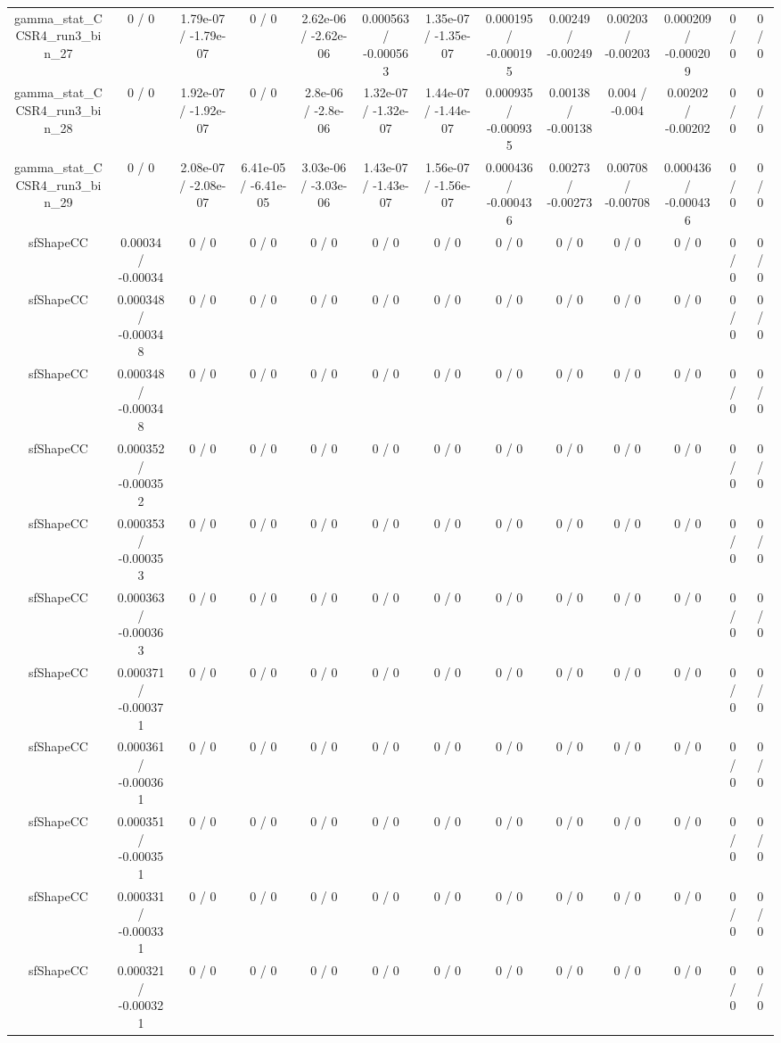 \documentclass[10pt]{article}
\begin{document}
\begin{table}[htbp]
\begin{center}
\begin{tabular}{|c|c|c|c|c|c|c|c|c|c|c|c|c|}
  gamma_stat_CCSR4_run3_bin_27 & 0 / 0 & 1.79e-07 / -1.79e-07 & 0 / 0 & 2.62e-06 / -2.62e-06 & 0.000563 / -0.000563 & 1.35e-07 / -1.35e-07 & 0.000195 / -0.000195 & 0.00249 / -0.00249 & 0.00203 / -0.00203 & 0.000209 / -0.000209 & 0 / 0 & 0 / 0 \\ 
  gamma_stat_CCSR4_run3_bin_28 & 0 / 0 & 1.92e-07 / -1.92e-07 & 0 / 0 & 2.8e-06 / -2.8e-06 & 1.32e-07 / -1.32e-07 & 1.44e-07 / -1.44e-07 & 0.000935 / -0.000935 & 0.00138 / -0.00138 & 0.004 / -0.004 & 0.00202 / -0.00202 & 0 / 0 & 0 / 0 \\ 
  gamma_stat_CCSR4_run3_bin_29 & 0 / 0 & 2.08e-07 / -2.08e-07 & 6.41e-05 / -6.41e-05 & 3.03e-06 / -3.03e-06 & 1.43e-07 / -1.43e-07 & 1.56e-07 / -1.56e-07 & 0.000436 / -0.000436 & 0.00273 / -0.00273 & 0.00708 / -0.00708 & 0.000436 / -0.000436 & 0 / 0 & 0 / 0 \\ 
  sfShapeCC & 0.00034 / -0.00034 & 0 / 0 & 0 / 0 & 0 / 0 & 0 / 0 & 0 / 0 & 0 / 0 & 0 / 0 & 0 / 0 & 0 / 0 & 0 / 0 & 0 / 0 \\ 
  sfShapeCC & 0.000348 / -0.000348 & 0 / 0 & 0 / 0 & 0 / 0 & 0 / 0 & 0 / 0 & 0 / 0 & 0 / 0 & 0 / 0 & 0 / 0 & 0 / 0 & 0 / 0 \\ 
  sfShapeCC & 0.000348 / -0.000348 & 0 / 0 & 0 / 0 & 0 / 0 & 0 / 0 & 0 / 0 & 0 / 0 & 0 / 0 & 0 / 0 & 0 / 0 & 0 / 0 & 0 / 0 \\ 
  sfShapeCC & 0.000352 / -0.000352 & 0 / 0 & 0 / 0 & 0 / 0 & 0 / 0 & 0 / 0 & 0 / 0 & 0 / 0 & 0 / 0 & 0 / 0 & 0 / 0 & 0 / 0 \\ 
  sfShapeCC & 0.000353 / -0.000353 & 0 / 0 & 0 / 0 & 0 / 0 & 0 / 0 & 0 / 0 & 0 / 0 & 0 / 0 & 0 / 0 & 0 / 0 & 0 / 0 & 0 / 0 \\ 
  sfShapeCC & 0.000363 / -0.000363 & 0 / 0 & 0 / 0 & 0 / 0 & 0 / 0 & 0 / 0 & 0 / 0 & 0 / 0 & 0 / 0 & 0 / 0 & 0 / 0 & 0 / 0 \\ 
  sfShapeCC & 0.000371 / -0.000371 & 0 / 0 & 0 / 0 & 0 / 0 & 0 / 0 & 0 / 0 & 0 / 0 & 0 / 0 & 0 / 0 & 0 / 0 & 0 / 0 & 0 / 0 \\ 
  sfShapeCC & 0.000361 / -0.000361 & 0 / 0 & 0 / 0 & 0 / 0 & 0 / 0 & 0 / 0 & 0 / 0 & 0 / 0 & 0 / 0 & 0 / 0 & 0 / 0 & 0 / 0 \\ 
  sfShapeCC & 0.000351 / -0.000351 & 0 / 0 & 0 / 0 & 0 / 0 & 0 / 0 & 0 / 0 & 0 / 0 & 0 / 0 & 0 / 0 & 0 / 0 & 0 / 0 & 0 / 0 \\ 
  sfShapeCC & 0.000331 / -0.000331 & 0 / 0 & 0 / 0 & 0 / 0 & 0 / 0 & 0 / 0 & 0 / 0 & 0 / 0 & 0 / 0 & 0 / 0 & 0 / 0 & 0 / 0 \\ 
  sfShapeCC & 0.000321 / -0.000321 & 0 / 0 & 0 / 0 & 0 / 0 & 0 / 0 & 0 / 0 & 0 / 0 & 0 / 0 & 0 / 0 & 0 / 0 & 0 / 0 & 0 / 0 \\ 

\end{tabular}
\end{center}
\end{table}
\end{document}
